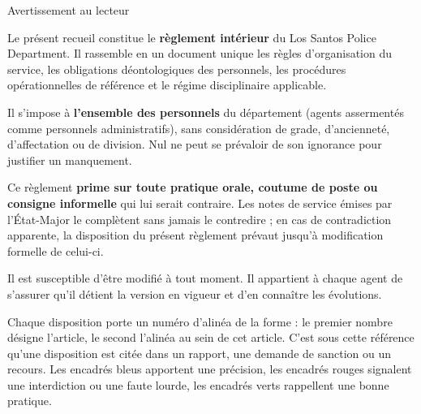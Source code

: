 \renewcommand{\lspdcourant}{Pages liminaires}

{\lspddisp\fontsize{22}{26}\selectfont\color{lspdnavy}Avertissement au lecteur}\\[4pt]
\lspdrulewide\vspace{3pt}
\noindent{}
\vspace{13pt}

\justifying
Le présent recueil constitue le \textbf{règlement intérieur} du Los Santos Police Department. Il rassemble en un document unique les règles d'organisation du service, les obligations déontologiques des personnels, les procédures opérationnelles de référence et le régime disciplinaire applicable.

\vspace{7pt}
Il s'impose à \textbf{l'ensemble des personnels} du département (agents assermentés comme personnels administratifs), sans considération de grade, d'ancienneté, d'affectation ou de division. Nul ne peut se prévaloir de son ignorance pour justifier un manquement.

\vspace{7pt}
Ce règlement \textbf{prime sur toute pratique orale, coutume de poste ou consigne informelle} qui lui serait contraire. Les notes de service émises par l'État-Major le complètent sans jamais le contredire ; en cas de contradiction apparente, la disposition du présent règlement prévaut jusqu'à modification formelle de celui-ci.

\vspace{7pt}
Il est susceptible d'être modifié à tout moment. Il appartient à chaque agent de s'assurer qu'il détient la version en vigueur et d'en connaître les évolutions.

\begin{note}
Chaque disposition porte un numéro d'alinéa de la forme \code{[12.04]} : le premier nombre désigne l'article, le second l'alinéa au sein de cet article. C'est sous cette référence qu'une disposition est citée dans un rapport, une demande de sanction ou un recours. Les encadrés bleus apportent une précision, les encadrés rouges signalent une interdiction ou une faute lourde, les encadrés verts rappellent une bonne pratique.
\end{note}

